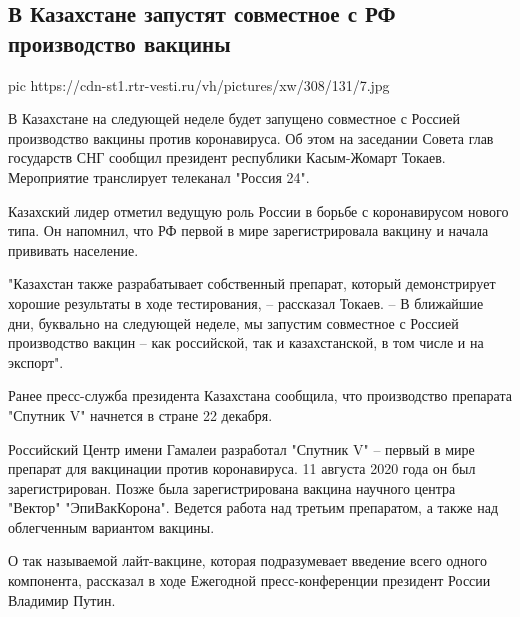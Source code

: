  
 
 
 
 
 
\subsection{В Казахстане запустят совместное с РФ производство вакцины}
\label{sec:18_12_2020.news.ru.vesti.1.kazahstran_vaccine}

\ifcmt
pic https://cdn-st1.rtr-vesti.ru/vh/pictures/xw/308/131/7.jpg
\fi

В Казахстане на следующей неделе будет запущено совместное с Россией
производство вакцины против коронавируса. Об этом на заседании Совета глав
государств СНГ сообщил президент республики Касым-Жомарт Токаев. Мероприятие
транслирует телеканал "Россия 24".

Казахский лидер отметил ведущую роль России в борьбе с коронавирусом нового
типа. Он напомнил, что РФ первой в мире зарегистрировала вакцину и начала
прививать население.

"Казахстан также разрабатывает собственный препарат, который демонстрирует
хорошие результаты в ходе тестирования, – рассказал Токаев. – В ближайшие дни,
буквально на следующей неделе, мы запустим совместное с Россией производство
вакцин – как российской, так и казахстанской, в том числе и на экспорт".

Ранее пресс-служба президента Казахстана сообщила, что производство препарата
"Спутник V" начнется в стране 22 декабря.

Российский Центр имени Гамалеи разработал "Спутник V" – первый в мире препарат
для вакцинации против коронавируса. 11 августа 2020 года он был
зарегистрирован. Позже была зарегистрирована вакцина научного центра "Вектор"
"ЭпиВакКорона". Ведется работа над третьим препаратом, а также над облегченным
вариантом вакцины.

О так называемой лайт-вакцине, которая подразумевает введение всего одного
компонента, рассказал в ходе Ежегодной пресс-конференции президент России
Владимир Путин.
